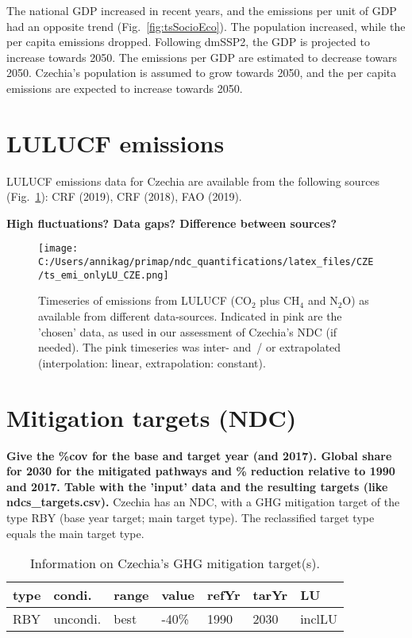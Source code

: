 \documentclass[12pt]{article}
\begin{document}
 The national GDP increased in recent years, and the emissions per unit of GDP had an opposite trend (Fig.~\ref{fig:tsSocioEco}).
 The population increased, while the per capita emissions dropped. 
 Following dmSSP2, the GDP is projected to increase towards 2050. 
 The emissions per GDP are estimated to decrease towars 2050. 
 Czechia's population is assumed to grow towards 2050, and the per capita emissions are expected to increase towards 2050. 

 \newpage %
 \section{LULUCF emissions}
 \label{sec:emiLULUCF}
 LULUCF emissions data for Czechia are available from the following sources (Fig.~\ref{fig:tsLULUCF}): CRF (2019), CRF (2018), FAO (2019).

 \textbf{High fluctuations? Data gaps? Difference between sources?}

 \begin{figure}[H]
 \centering
 \texttt{[image: C:/Users/annikag/primap/ndc\_quantifications/latex\_files/CZE/ts\_emi\_onlyLU\_CZE.png]}
 \caption{Timeseries of emissions from LULUCF (CO$_2$ plus CH$_4$ and N$_2$O) as available from different data-sources. 
 Indicated in pink are the 'chosen' data, as used in our assessment of Czechia's NDC (if needed). 
 The pink timeseries was inter- and~/ or extrapolated (interpolation: linear, extrapolation: constant).}
 \label{fig:tsLULUCF}
 \end{figure}

 \newpage %
 \section{Mitigation targets (NDC)}
 \label{sec:mitiTars}

 \textbf{ 
 Give the \%cov for the base and target year (and 2017).
 Global share for 2030 for the mitigated pathways and \% reduction relative to 1990 and 2017.
 Table with the 'input' data and the resulting targets (like ndcs\_targets.csv).}
 Czechia has an NDC, with a GHG mitigation target of the type RBY (base year target; main target type).
 The reclassified target type equals the main target type.

 \begin{table}[H]
 \centering
 \caption{Information on Czechia's GHG mitigation target(s).}
 \label{tab:mitiTars}
 \begin{tabular}{l l l l l l l }
 \bfseries type & \bfseries condi. & \bfseries range & \bfseries value & \bfseries refYr & \bfseries tarYr & \bfseries LU \tabularnewline \hline
 RBY & uncondi. & best & -40\% & 1990 & 2030 & inclLU \tabularnewline 
 \end{tabular}
 \end{table}
\end{document}

